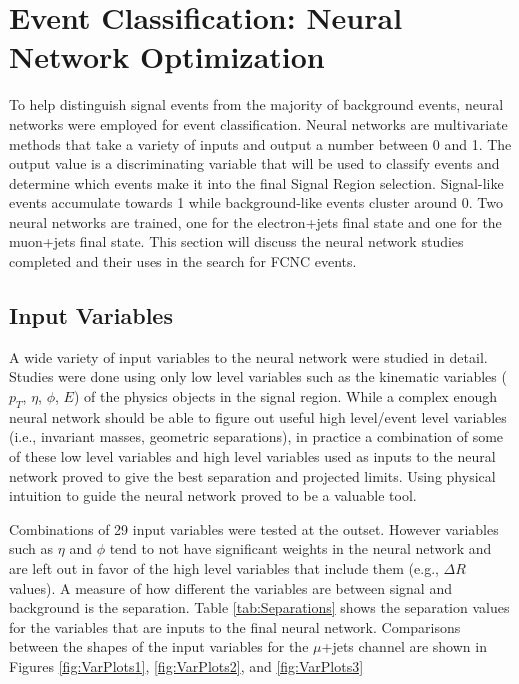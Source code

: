 
\section{Event Classification: Neural Network Optimization}
\label{sec:NN} 
To help distinguish signal events from the majority of background events, neural networks were employed for event classification.  Neural networks are multivariate methods that take a variety of inputs and output a number between 0 and 1.  The output value is a discriminating variable that will be used to classify events and determine which events make it into the final Signal Region selection.  Signal-like events accumulate towards 1 while background-like events cluster around 0.  Two neural networks are trained, one for the electron+jets final state and one for the muon+jets final state.  This section will discuss the neural network studies completed and their uses in the search for FCNC events.  

\subsection{Input Variables}
A wide variety of input variables to the neural network were studied in detail.  Studies were done using only low level variables such as the kinematic variables  ($p_T$, $\eta$, $\phi$, $E$)  of the physics objects in the signal region. While a complex enough neural network should be able to figure out useful high level/event level variables (i.e., invariant masses, geometric separations), in practice a combination of some of these low level variables and high level variables used as inputs to the neural network proved to give the best separation and projected limits.  Using physical intuition to guide the neural network proved to be a valuable tool.

Combinations of 29 input variables were tested at the outset.  However variables such as $\eta$ and $\phi$ tend to not have significant weights in the neural network and are left out in favor of the high level variables that include them (e.g., $\Delta R$ values).  A measure of how different the variables are between signal and background is the separation.  Table \ref{tab:Separations} shows the separation values for the variables that are inputs to the final neural network.  Comparisons between the shapes of the input variables for the $\mu$+jets channel are shown in Figures \ref{fig:VarPlots1}, \ref{fig:VarPlots2}, and \ref{fig:VarPlots3}


